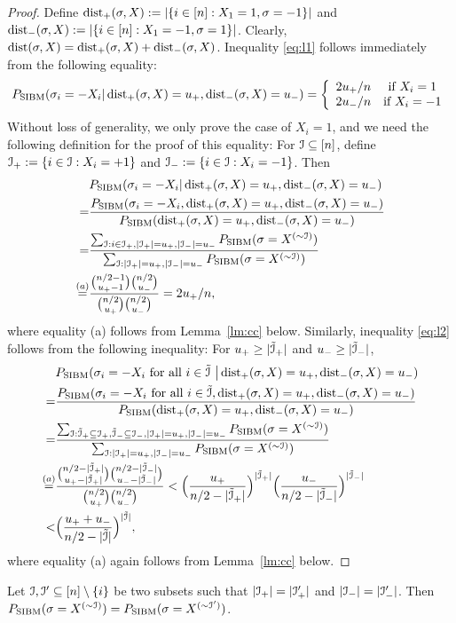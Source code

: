 \documentclass{article}
\begin{document}
\begin{proof}
Define $\operatorname{dist}_+(\sigma,X):=|\{i\in[n]:X_1=1, \sigma=-1\}|$ and $\operatorname{dist}_-(\sigma,X):=|\{i\in[n]:X_1=-1, \sigma=1\}|$. Clearly, $\operatorname{dist}(\sigma,X)=\operatorname{dist}_+(\sigma,X)+\operatorname{dist}_-(\sigma,X)$. Inequality \eqref{eq:l1} follows immediately from the following equality:
$$
P_{\operatorname{SIBM}}(\sigma_i=-X_i|
\operatorname{dist}_+(\sigma,X)=u_+,
\operatorname{dist}_-(\sigma,X)=u_-) 
=\left\{
\begin{array}{cc}
  2u_+/n   & \mbox{if~} X_i=1 \\
  2u_-/n   & \mbox{if~} X_i=-1
\end{array}
\right.
$$
Without loss of generality,
we only prove the case of $X_i=1$, and
we need the following definition for the proof of this equality:
For $\mathcal{I}\subseteq[n]$, define $\mathcal{I}_+:=\{i\in\mathcal{I}:X_i=+1\}$ and $\mathcal{I}_-:=\{i\in\mathcal{I}:X_i=-1\}$.
Then
\begin{align*}
& P_{\operatorname{SIBM}}(\sigma_i=-X_i|
\operatorname{dist}_+(\sigma,X)=u_+,
\operatorname{dist}_-(\sigma,X)=u_-)  \\
= & \frac{P_{\operatorname{SIBM}}(\sigma_i=-X_i ,
\operatorname{dist}_+(\sigma,X)=u_+,
\operatorname{dist}_-(\sigma,X)=u_-)}{P_{\operatorname{SIBM}}(
\operatorname{dist}_+(\sigma,X)=u_+,
\operatorname{dist}_-(\sigma,X)=u_-)} \\
= & \frac{\sum_{\mathcal{I}:i\in\mathcal{I}_+,|\mathcal{I}_+|=u_+,|\mathcal{I}_-|=u_-}P_{\operatorname{SIBM}}(\sigma=X^{(\sim\mathcal{I})}) }
{\sum_{\mathcal{I}:|\mathcal{I}_+|=u_+,|\mathcal{I}_-|=u_-}P_{\operatorname{SIBM}}(\sigma=X^{(\sim\mathcal{I})}) } \\
\overset{(a)}{=} & \frac{\binom{n/2-1}{u_+ -1} \binom{n/2}{u_-}}
{\binom{n/2}{u_+} \binom{n/2}{u_-}}
= 2u_+/n ,
\end{align*}
where equality (a) follows from Lemma~\ref{lm:cc} below.
Similarly, inequality \eqref{eq:l2} follows from the following inequality:
For $u_+\ge |\tilde{\mathcal{I}}_+|$ and $u_-\ge |\tilde{\mathcal{I}}_-|$,
\begin{align*}
& P_{\operatorname{SIBM}}(\sigma_i=-X_i \text{~for all~}  i\in\tilde{\mathcal{I}} ~ \big|
\operatorname{dist}_+(\sigma,X)=u_+,
\operatorname{dist}_-(\sigma,X)=u_-)  \\
= & \frac{P_{\operatorname{SIBM}}(\sigma_i=-X_i \text{~for all~}  i\in\tilde{\mathcal{I}} ,
\operatorname{dist}_+(\sigma,X)=u_+,
\operatorname{dist}_-(\sigma,X)=u_-)}{P_{\operatorname{SIBM}}(
\operatorname{dist}_+(\sigma,X)=u_+,
\operatorname{dist}_-(\sigma,X)=u_-)} \\
= & \frac{\sum_{\mathcal{I}:\tilde{\mathcal{I}}_+\subseteq\mathcal{I}_+,
\tilde{\mathcal{I}}_-\subseteq\mathcal{I}_-,
|\mathcal{I}_+|=u_+,|\mathcal{I}_-|=u_-}P_{\operatorname{SIBM}}(\sigma=X^{(\sim\mathcal{I})}) }
{\sum_{\mathcal{I}:|\mathcal{I}_+|=u_+,|\mathcal{I}_-|=u_-}P_{\operatorname{SIBM}}(\sigma=X^{(\sim\mathcal{I})}) }  \\
\overset{(a)}{=} & \frac{\binom{n/2-|\tilde{\mathcal{I}}_+|}{u_+ -|\tilde{\mathcal{I}}_+|} \binom{n/2 - |\tilde{\mathcal{I}}_-|}{u_- - |\tilde{\mathcal{I}}_-|}}
{\binom{n/2}{u_+} \binom{n/2}{u_-}}
< \Big(\frac{u_+}{n/2- |\tilde{\mathcal{I}}_+|} \Big)^{|\tilde{\mathcal{I}}_+|}
\Big(\frac{u_-}{n/2- |\tilde{\mathcal{I}}_-|} \Big)^{|\tilde{\mathcal{I}}_-|} \\
< & \Big(\frac{u_+ + u_-}{n/2- |\tilde{\mathcal{I}}|} \Big)^{|\tilde{\mathcal{I}}|}  ,
\end{align*}
where equality (a) again follows from Lemma~\ref{lm:cc} below.
\end{proof}







\begin{lemma} \label{lm:cc}
Let $\mathcal{I},\mathcal{I}'\subseteq[n]\setminus\{i\}$ be two subsets such that $|\mathcal{I}_+|=|\mathcal{I}_+'|$ and $|\mathcal{I}_-|=|\mathcal{I}_-'|$. 
Then $P_{\operatorname{SIBM}}(\sigma=X^{(\sim\mathcal{I})}) = P_{\operatorname{SIBM}}(\sigma=X^{(\sim\mathcal{I}')})$.
\end{lemma}



\end{document}
